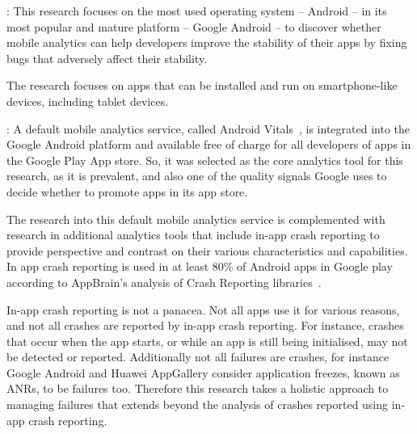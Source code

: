 : This research focuses on the most used operating system -- Android -- in its most popular and mature platform -- Google Android -- to discover whether mobile analytics can help developers improve the stability of their apps by fixing bugs that adversely affect their stability.

The research focuses on apps that can be installed and run on smartphone-like devices, including tablet devices.

: A default mobile analytics service, called Android Vitals~, is integrated into the Google Android platform and available free of charge for all developers of apps in the Google Play App store. So, it was selected as the core analytics tool for this research, as it is prevalent, and also one of the quality signals Google uses to decide whether to promote apps in its app store. %

 The research into this default mobile analytics service is complemented with research in additional analytics tools that include in-app crash reporting to provide perspective and contrast on their various characteristics and capabilities. %
In app crash reporting is used in at least 80\% of Android apps in Google play according to AppBrain's analysis of Crash Reporting libraries~.

 In-app crash reporting is not a panacea. Not all apps use it for various reasons, and not all crashes are reported by in-app crash reporting. For instance, crashes that occur when the app starts, or while an app is still being initialised, may not be detected or reported. Additionally not all failures are crashes, for instance Google Android and Huawei AppGallery consider application freezes, known as ANRs, to be failures too. Therefore this research takes a holistic approach to managing failures that extends beyond the analysis of crashes reported using in-app crash reporting.   %

